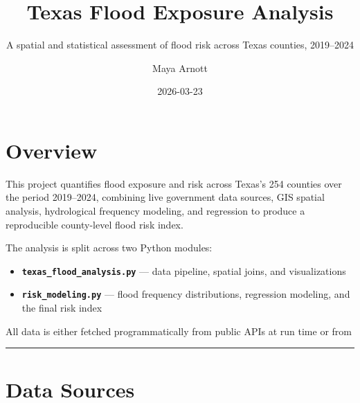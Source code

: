 \documentclass[
  letterpaper,
  DIV=11,
  numbers=noendperiod]{scrartcl}
\title{Texas Flood Exposure Analysis}
\subtitle{A spatial and statistical assessment of flood risk across
Texas counties, 2019--2024}
\author{Maya Arnott}
\date{2026-03-23}
\providecommand{\tightlist}{%
  \setlength{\itemsep}{0pt}\setlength{\parskip}{0pt}}
\renewcommand*\contentsname{Table of contents}
\newcommand\contentsname{Table of contents}
\begin{document}
\maketitle

\renewcommand*\contentsname{Table of contents}
{
\setcounter{tocdepth}{3}
\tableofcontents
}

\section{Overview}\label{overview}

This project quantifies flood exposure and risk across Texas's 254
counties over the period 2019--2024, combining live government data
sources, GIS spatial analysis, hydrological frequency modeling, and
regression to produce a reproducible county-level flood risk index.

The analysis is split across two Python modules:

\begin{itemize}
\tightlist
\item
  \textbf{\texttt{texas\_flood\_analysis.py}} --- data pipeline, spatial
  joins, and visualizations
\item
  \textbf{\texttt{risk\_modeling.py}} --- flood frequency distributions,
  regression modeling, and the final risk index
\end{itemize}

All data is either fetched programmatically from public APIs at run time
or from

\begin{center}\rule{0.5\linewidth}{0.5pt}\end{center}

\section{Data Sources}\label{data-sources}
\end{document}

